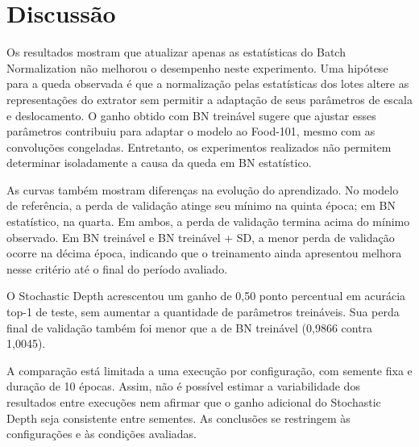 \section{Discussão}
\label{sec:discussao}

Os resultados mostram que atualizar apenas as estatísticas do Batch
Normalization não melhorou o desempenho neste experimento. Uma hipótese
para a queda observada é que a normalização pelas estatísticas dos lotes
altere as representações do extrator sem permitir a adaptação de seus
parâmetros de escala e deslocamento. O ganho obtido com
BN treinável sugere que ajustar esses parâmetros contribuiu
para adaptar o modelo ao Food-101, mesmo com as convoluções congeladas.
Entretanto, os experimentos realizados não permitem determinar isoladamente
a causa da queda em BN estatístico.

As curvas também mostram diferenças na evolução do aprendizado. No
modelo de referência, a perda de validação atinge seu mínimo na quinta época;
em BN estatístico, na quarta. Em ambos, a perda de validação termina
acima do mínimo observado. Em
BN treinável e BN treinável + SD, a menor perda
de validação ocorre na décima
época, indicando que o treinamento ainda apresentou melhora nesse critério
até o final do período avaliado.

O Stochastic Depth acrescentou um ganho de 0,50 ponto percentual em
acurácia top-1 de teste, sem aumentar a quantidade de parâmetros treináveis.
Sua perda final de validação também foi menor que a de
BN treinável (0,9866 contra 1,0045).

A comparação está limitada a uma execução por configuração, com semente
fixa e duração de 10 épocas. Assim, não é possível estimar a variabilidade
dos resultados entre execuções nem afirmar que o ganho adicional do
Stochastic Depth seja consistente entre sementes. As conclusões se
restringem às configurações e às condições avaliadas.
